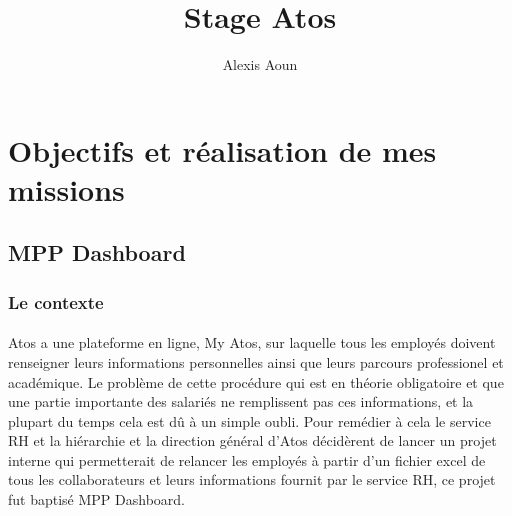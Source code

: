 \documentclass[12pt]{article}
\author {Alexis Aoun}
\begin{document}
\begin {sloppypar}
\title {Stage Atos}
\date {}
\maketitle
\newpage

\section {Objectifs et réalisation de mes missions}
\subsection {MPP Dashboard}
\subsubsection {Le contexte}
\paragraph {}
Atos a une plateforme en ligne, My Atos, sur laquelle tous les employés doivent 
renseigner leurs informations personnelles ainsi que leurs parcours professionel et 
académique. Le problème de cette procédure qui est en théorie obligatoire et que 
une partie importante des salariés ne remplissent pas ces informations, et la plupart 
du temps cela est dû à un simple oubli. Pour remédier à cela le service RH et la 
hiérarchie et la direction général d'Atos décidèrent de lancer un projet interne 
qui permetterait de relancer les employés à partir d'un fichier excel de tous les 
collaborateurs et leurs informations fournit par le service RH, ce projet fut baptisé 
MPP Dashboard.


\end{sloppypar}
\end{document}
